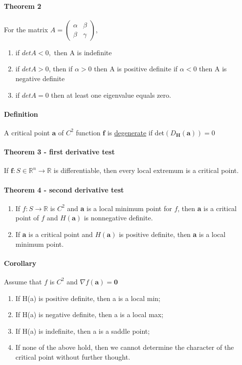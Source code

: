 \documentclass[11pt]{article}
\newcommand{\tb}[1]{\textbf{#1}}
\newcommand{\real}[0]{\mathbb{R}}
\newcommand{\under}[1]{\underline{#1}}
\begin{document}
\paragraph{Theorem 2} For the matrix $A = \begin{pmatrix}
    \alpha & \beta \\
    \beta & \gamma 
\end{pmatrix}$,
\begin{enumerate}
    \item if $det A < 0,$ then A is indefinite
    \item if $det A > 0$, then
    \subitem if $\alpha > 0$ then A is positive definite
    \subitem if $\alpha < 0$ then A is negative definite
    \item if $det A = 0$ then at least one eigenvalue equals zero.
\end{enumerate}
\paragraph{Definition} A critical point $\tb{a}$ of $C^2$ function $\tb{f}$ is \under{degenerate} if det$(D_\tb{H}(\tb{a})) = 0$
\paragraph{Theorem 3 - first derivative test} If $\tb{f}: S \in \real^n \rightarrow \real$ is differentiable, then every local extremum is a critical point.
\paragraph{Theorem 4 - second derivative test}
\begin{enumerate}
    \item If $f: S \rightarrow \real$ is $C^2$ and \tb{a} is a local minimum point for $f$, then \tb{a} is a critical point of $f$ and $H(\tb{a})$ is nonnegative definite.
    \item If \tb{a} is a critical point and $H(\tb{a})$ is positive definite, then \tb{a} is a local minimum point.
\end{enumerate}
\paragraph{Corollary} Assume that $f$ is $C^2$ and $\nabla f(\tb{a}) = \tb{0}$
\begin{enumerate}
    \item If H(a) is positive definite, then a is a local min;
    \item If H(a) is negative definite, then a is a local max;
    \item If H(a) is indefinite, then a is a saddle point;
    \item If none of the above hold, then we cannot determine the character of the critical point without further thought.
\end{enumerate} 
\end{document}
